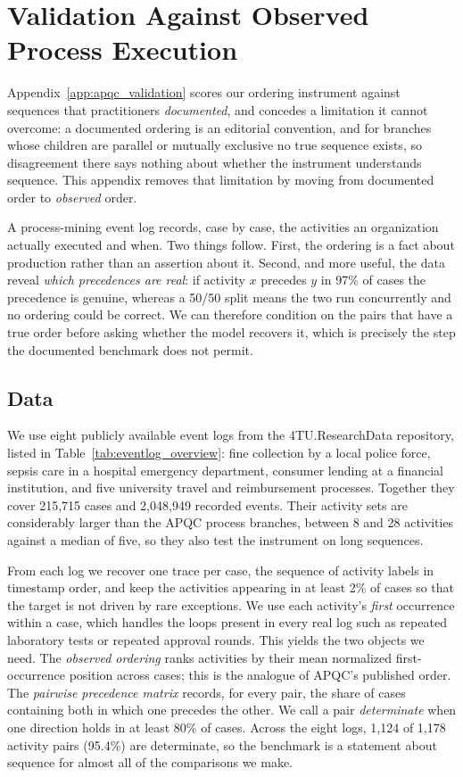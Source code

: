 \section{Validation Against Observed Process Execution}
\label{app:eventlog_validation}

Appendix~\ref{app:apqc_validation} scores our ordering instrument against sequences that practitioners
\emph{documented}, and concedes a limitation it cannot overcome: a documented ordering is an editorial
convention, and for branches whose children are parallel or mutually exclusive no true sequence exists, so
disagreement there says nothing about whether the instrument understands sequence.
This appendix removes that limitation by moving from documented order to \emph{observed} order.

A process-mining event log records, case by case, the activities an organization actually executed and when.
Two things follow.
First, the ordering is a fact about production rather than an assertion about it.
Second, and more useful, the data reveal \emph{which precedences are real}: if activity $x$ precedes $y$ in
97\% of cases the precedence is genuine, whereas a 50/50 split means the two run concurrently and no
ordering could be correct.
We can therefore condition on the pairs that have a true order before asking whether the model recovers it,
which is precisely the step the documented benchmark does not permit.

\subsection{Data}
\label{app:eventlog_data}

We use eight publicly available event logs from the 4TU.ResearchData repository, listed in
Table~\ref{tab:eventlog_overview}: fine collection by a local police force, sepsis care in a hospital
emergency department, consumer lending at a financial institution, and five university travel and
reimbursement processes.
Together they cover 215,715 cases and 2,048,949 recorded events.
Their activity sets are considerably larger than the APQC process branches, between 8 and 28 activities
against a median of five, so they also test the instrument on long sequences.

From each log we recover one trace per case, the sequence of activity labels in timestamp order, and keep the
activities appearing in at least 2\% of cases so that the target is not driven by rare exceptions.
We use each activity's \emph{first} occurrence within a case, which handles the loops present in every real
log such as repeated laboratory tests or repeated approval rounds.
This yields the two objects we need.
The \emph{observed ordering} ranks activities by their mean normalized first-occurrence position across
cases; this is the analogue of APQC's published order.
The \emph{pairwise precedence matrix} records, for every pair, the share of cases containing both in which
one precedes the other.
We call a pair \emph{determinate} when one direction holds in at least 80\% of cases.
Across the eight logs, 1,124 of 1,178 activity pairs (95.4\%) are determinate, so the benchmark is a
statement about sequence for almost all of the comparisons we make.


